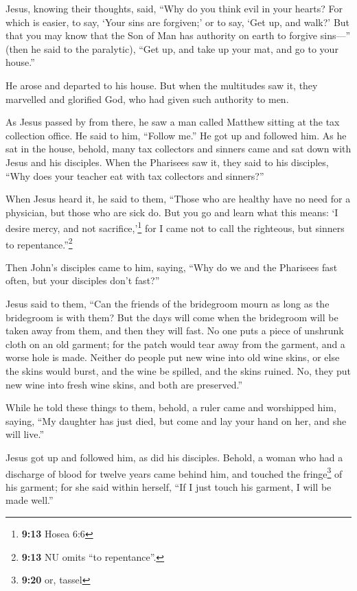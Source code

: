  Jesus, knowing their thoughts, said, ``Why do you think
evil in your hearts?  For which is easier, to say, `Your
sins are forgiven;' or to say, `Get up, and walk?'  But
that you may know that the Son of Man has authority on earth to forgive
sins---'' (then he said to the paralytic), ``Get up, and take up your
mat, and go to your house.''

 He arose and departed to his house.  But
when the multitudes saw it, they marvelled and glorified God, who had
given such authority to men.

 As Jesus passed by from there, he saw a man called
Matthew sitting at the tax collection office. He said to him, ``Follow
me.'' He got up and followed him.  As he sat in the
house, behold, many tax collectors and sinners came and sat down with
Jesus and his disciples.  When the Pharisees saw it, they
said to his disciples, ``Why does your teacher eat with tax collectors
and sinners?''

 When Jesus heard it, he said to them, ``Those who are
healthy have no need for a physician, but those who are sick do.
 But you go and learn what this means: `I desire mercy,
and not sacrifice,'\footnote{\textbf{9:13} Hosea 6:6} for I came not to
call the righteous, but sinners to repentance.''\footnote{\textbf{9:13}
  NU omits ``to repentance''.}

 Then John's disciples came to him, saying, ``Why do we
and the Pharisees fast often, but your disciples don't fast?''

 Jesus said to them, ``Can the friends of the bridegroom
mourn as long as the bridegroom is with them? But the days will come
when the bridegroom will be taken away from them, and then they will
fast.  No one puts a piece of unshrunk cloth on an old
garment; for the patch would tear away from the garment, and a worse
hole is made.  Neither do people put new wine into old
wine skins, or else the skins would burst, and the wine be spilled, and
the skins ruined. No, they put new wine into fresh wine skins, and both
are preserved.''

 While he told these things to them, behold, a ruler came
and worshipped him, saying, ``My daughter has just died, but come and
lay your hand on her, and she will live.''

 Jesus got up and followed him, as did his disciples.
 Behold, a woman who had a discharge of blood for twelve
years came behind him, and touched the fringe\footnote{\textbf{9:20} or,
  tassel} of his garment;  for she said within herself,
``If I just touch his garment, I will be made well.''

